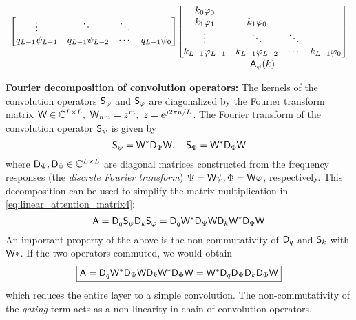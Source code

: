 \begin{equation}
\begin{aligned}
{\begin{bmatrix}
            \vdots & \ddots & \ddots & \\
            q_{L-1} \psi_{L-1} & q_{L-1} \psi_{L-2} & \cdots & q_{L-1} \psi_0
        \end{bmatrix}}
        \underset{\displaystyle \mathsf{A}_\varphi(k)}{ 
        \begin{bmatrix}
            k_0 \varphi_0 &  &  &  \\
            k_1 \varphi_1 & k_1 \varphi_0 &  &  \\
            \vdots & \ddots & \ddots & \\
            k_{L-1} \varphi_{L-1} & k_{L-1} \varphi_{L-2} & \cdots & k_{L-1} \varphi_0
        \end{bmatrix}} &\\
    \end{aligned}
\end{equation}
%
\begin{tcolorbox} {\bf Fourier decomposition of convolution operators:} The kernels of the convolution operators $\mathsf{S}_\psi$ and $\mathsf{S}_\varphi$ are diagonalized by the Fourier transform matrix $\mathsf{W}\in\mathbb{C}^{L\times L},~ \mathsf{W}_{nm} = z^{m}, ~ z = e^{j 2\pi n / L}$. The Fourier transform of the convolution operator $\mathsf{S}_\psi$ is given by
%
\begin{equation}
    \mathsf{S}_\psi = \mathsf{W}^* \mathsf{D}_\Psi \mathsf{W}, \quad \mathsf{S}_\Phi = \mathsf{W}^* \mathsf{D}_\Phi \mathsf{W}
\end{equation}
%
where $\mathsf{D}_\Psi, \mathsf{D}_\Phi\in\mathbb{C}^{L\times L}$ are diagonal matrices constructed from the frequency responses (the \textit{discrete Fourier transform}) $\Psi=\mathsf{W}\psi,\Phi=\mathsf{W}\varphi$, respectively. This decomposition can be used to simplify the matrix multiplication in \eqref{eq:linear_attention_matrix4}:
%
\begin{equation}
    \mathsf{A} = \mathsf{D}_q \mathsf{S}_\psi \mathsf{D}_k \mathsf{S}_\varphi = \mathsf{D}_q  \mathsf{W}^* \mathsf{D}_\Psi \mathsf{W} \mathsf{D}_k \mathsf{W}^* \mathsf{D}_\Phi \mathsf{W}
\end{equation}
%
An important property of the above is the non-commutativity of $\mathsf{D}_q$ and $\mathsf{S}_k$ with $\mathsf{W}*$. If the two operators commuted, we would obtain
%
\begin{equation}
    \boxed{
    \mathsf{A} =  \mathsf{D}_q  \mathsf{W}^* \mathsf{D}_\Psi \mathsf{W} \mathsf{D}_k \mathsf{W}^* \mathsf{D}_\Phi \mathsf{W} = \mathsf{W}^* \mathsf{D}_q \mathsf{D}_\Psi \mathsf{D}_k \mathsf{D}_\Phi \mathsf{W}
    }
\end{equation}
%
which reduces the entire layer to a simple convolution. The non-commutativity of the \textit{gating} term acts as a non-linearity in chain of convolution operators.
%
\end{tcolorbox}

%

